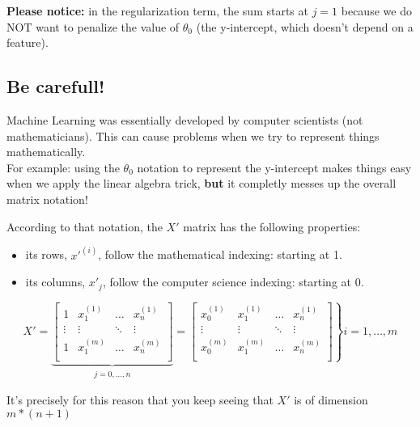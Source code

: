 \documentclass[]{article}
\begin{document}
\textbf{Please notice:} in the regularization term, the sum starts at
\(j = 1\) because we do NOT want to penalize the value of \(\theta_0\)
(the y-intercept, which doesn't depend on a feature).

\hypertarget{be-carefull}{%
\subsection{Be carefull!}\label{be-carefull}}

Machine Learning was essentially developed by computer scientists (not
mathematicians). This can cause problems when we try to represent things
mathematically.\\
For example: using the \(\theta_0\) notation to represent the
y-intercept makes things easy when we apply the linear algebra trick,
\textbf{but} it completly messes up the overall matrix notation!

According to that notation, the \(X'\) matrix has the following
properties:

\begin{itemize}
\item
  its rows, \(x'^{(i)}\), follow the mathematical indexing: starting at
  1.
\item
  its columns, \(x'_j\), follow the computer science indexing: starting
  at 0.
\end{itemize}

\large

\[
X' =
\underbrace{
\begin{bmatrix}
1 & x_1^{(1)} & \dots & x_n^{(1)} \\
\vdots & \vdots & \ddots & \vdots \\ 
1 & x_1^{(m)} & \dots & x_n^{(m)} \\ 
\end{bmatrix}  
}_{\begin{matrix}
    j = 0, \dots, n
\end{matrix}}
=     
\left .
\begin{bmatrix}
x_0^{(1)} & x_1^{(1)} & \dots & x_n^{(1)} \\
\vdots & \vdots & \ddots & \vdots \\ 
x_0^{(m)} & x_1^{(m)} & \dots & x_n^{(m)} \\ 
\end{bmatrix}
\right \} i = 1, \dots, m
\] \normalsize

It's precisely for this reason that you keep seeing that \(X'\) is of
dimension \(m * (n+1)\)
\end{document}
